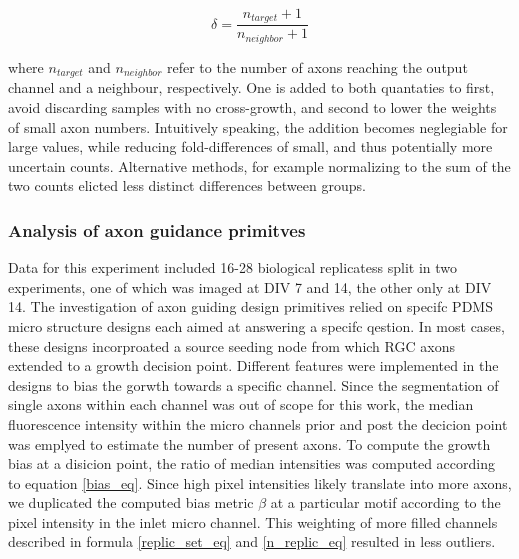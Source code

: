 \begin{equation}
    \delta = \frac{n_{target}+1}{n_{neighbor}+1}
    \label{folddiff}
\end{equation}
\vspace{3mm}

where $n_{target}$ and $n_{neighbor}$ refer to the number of axons reaching the
output channel and a neighbour, respectively. One is added to both quantaties to
first, avoid discarding samples with no cross-growth, and second to lower the
weights of small axon numbers. Intuitively speaking, the addition becomes
neglegiable for large values, while reducing fold-differences of small, and thus
potentially more uncertain counts. Alternative methods, for example normalizing
to the sum of the two counts elicted less distinct differences between groups.


\subsubsection{Analysis of axon guidance primitves}
Data for this experiment included 16-28 biological replicatess split in two
experiments, one of which was imaged at DIV 7 and 14, the other only at DIV 14.
The investigation of axon guiding design primitives relied on specifc PDMS micro
structure designs each aimed at answering a specifc qestion. In most cases,
these designs incorproated a source seeding node from which RGC axons extended
to a growth decision point. Different features were implemented in the designs
to bias the gorwth towards a specific channel. Since the segmentation of single
axons within each channel was out of scope for this work, the median
fluorescence intensity within the micro channels prior and post the decicion
point was emplyed to estimate the number of present axons. To compute the growth
bias at a disicion point, the ratio of median intensities was computed according
to equation \ref{bias_eq}. Since high pixel intensities likely translate into
more axons, we duplicated the computed bias metric $\beta$ at a particular motif
according to the pixel intensity in the inlet micro channel. This weighting of
more filled channels described in formula \ref{replic_set_eq} and
\ref{n_replic_eq} resulted in less outliers.

